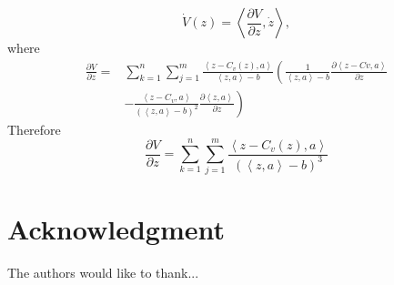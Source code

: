 \documentclass[journal]{IEEEtran}
\begin{document}
\begin{equation}
\dot{V}(z) = \left< \frac{\partial V}{\partial z}, \dot{z} \right>,
\end{equation}
where 
\begin{equation}
\begin{split}
\frac{\partial V}{\partial z} =& \sum^n_{k=1} \sum^m_{j=1} \frac{\left< z-C_v(z),a \right>}{\left<z,a \right> -b}  \left( \frac{1}{\left< z,a \right>-b} \frac{\partial \left< z-Cv,a \right>}{\partial z} \right. \\
& -\left. \frac{\left< z-C_v, a \right>}{\left(\left< z,a \right>-b \right)^2} \frac{\partial \left<z,a \right>}{\partial z} \right)
\end{split}
\end{equation}
Therefore
\begin{equation}
\frac{\partial V}{\partial z} = \sum^n_{k=1} \sum^m_{j=1} \frac{\left< z-C_v(z),a \right>}{\left(\left<z,a \right> -b\right)^3}
\end{equation}


\section*{Acknowledgment}


The authors would like to thank...


\ifCLASSOPTIONcaptionsoff
  \newpage
\fi





%
%
%
\end{document}
